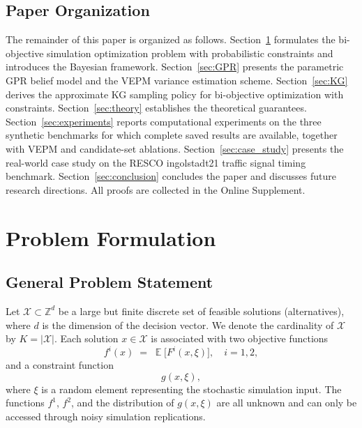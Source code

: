 \documentclass[12pt]{article}
\theoremstyle{plain}
\theoremstyle{definition}
\theoremstyle{remark}
\DeclareMathOperator{\E}{\mathbb{E}}
\newcommand{\Z}{\mathbb{Z}}
\newcommand{\cX}{\mathcal{X}}
\begin{document}
\subsection{Paper Organization}\label{sec:organization}

The remainder of this paper is organized as follows.
Section~\ref{sec:formulation} formulates the bi-objective
simulation optimization problem with probabilistic constraints and
introduces the Bayesian framework.
Section~\ref{sec:GPR} presents the parametric GPR belief model and the VEPM
variance estimation scheme.
Section~\ref{sec:KG} derives the approximate KG sampling policy for
bi-objective optimization with constraints.
Section~\ref{sec:theory} establishes the theoretical guarantees.
Section~\ref{sec:experiments} reports computational experiments on the
three synthetic benchmarks for which complete saved results are
available, together with VEPM and candidate-set ablations.
Section~\ref{sec:case_study} presents the real-world case study on the
RESCO ingolstadt21 traffic signal timing benchmark.
Section~\ref{sec:conclusion} concludes the paper and discusses future research
directions.
All proofs are collected in the Online Supplement.


\section{Problem Formulation}\label{sec:formulation}

\subsection{General Problem Statement}\label{sec:problem_statement}

Let $\cX\subset\Z^d$ be a large but finite discrete set of feasible
solutions (alternatives), where $d$ is the dimension of the decision
vector.  We denote the cardinality of $\cX$ by $K=|\cX|$.  Each
solution $x\in\cX$ is associated with two objective functions
\begin{equation}\label{eq:objectives}
  f^i(x) \;=\; \E\bigl[F^i(x,\xi)\bigr], \quad i=1,2,
\end{equation}
and a constraint function
\begin{equation}\label{eq:constraint_function}
  g(x,\xi),
\end{equation}
where $\xi$ is a random element representing the stochastic
simulation input.  The functions $f^1$, $f^2$, and the distribution
of $g(x,\xi)$ are all unknown and can only be accessed through
noisy simulation replications.
\end{document}
